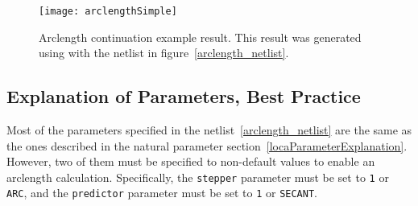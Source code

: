 \begin{figure}[ht]
  \centering
  \scalebox{0.7}
  {\texttt{[image: arclengthSimple]}}
  \caption [Arclength continuation example result. ]
  {Arclength continuation example result. This result was generated using \Xyce{} with the netlist in figure~\ref{arclength_netlist}.
\label{arclengthResult}
}
\end{figure}

\subsection{Explanation of Parameters, Best Practice}

Most of the parameters specified in the netlist~\ref{arclength_netlist} are 
the same as the ones described in the natural parameter 
section~\ref{locaParameterExplanation}.  However, two of them must be specified to non-default
values to enable an arclength calculation.   Specifically, the \texttt{stepper} 
parameter must be set to \texttt{1} or \texttt{ARC}, and the \texttt{predictor} 
parameter must be set to \texttt{1} or \texttt{SECANT}. 


